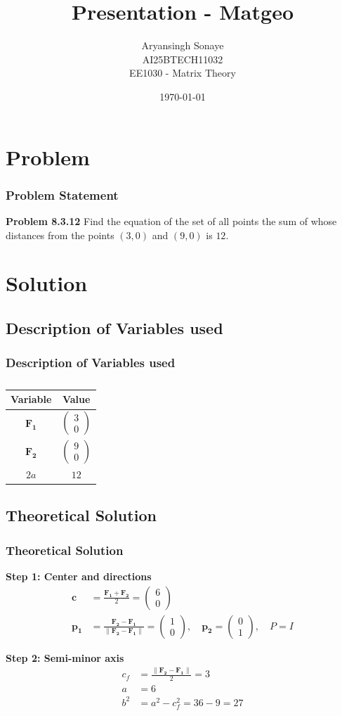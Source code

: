 \documentclass{beamer}
\title{Presentation - Matgeo}
\author{Aryansingh Sonaye \\
AI25BTECH11032 \\
EE1030 - Matrix Theory}
\date{\today}
\theoremstyle{remark}
\newcommand{\myvec}[1]{\ensuremath{\begin{pmatrix}#1\end{pmatrix}}}
\let\vec\mathbf
\numberwithin{equation}{section}
\begin{document}
\begin{frame}
\titlepage
\end{frame}

\section{Problem}
\begin{frame}
\frametitle{Problem Statement}
\textbf{Problem 8.3.12}
Find the equation of the set of all points the sum of whose distances 
from the points $(3,0)$ and $(9,0)$ is $12$.

\end{frame}

\section{Solution}
\subsection{Description of Variables used}
\begin{frame}
\frametitle{Description of Variables used}
\begin{table}[H]
\centering
\begin{tabular}{|c|c|}
\hline
Variable & Value \\
\hline
$\vec{F_1}$ & $\myvec{3\\0}$ \\
\hline
$\vec{F_2}$ & $\myvec{9\\0}$ \\
\hline
$2a$ & $12$ \\
\hline
\end{tabular}
\caption{} \label{}
\end{table}


\end{frame}

\subsection{Theoretical Solution }
\begin{frame}
\frametitle{Theoretical Solution}
\textbf{Step 1: Center and directions}
\begin{align}
\vec{c} &= \frac{\vec{F_1}+\vec{F_2}}{2} 
= \myvec{6\\0} \\[6pt]
\vec{p_1} &= \frac{\vec{F_2}-\vec{F_1}}{\|\vec{F_2}-\vec{F_1}\|}
= \myvec{1\\0}, \quad 
\vec{p_2} = \myvec{0\\1}, \quad 
P = I
\end{align}

\textbf{Step 2: Semi-minor axis}
\begin{align}
c_f &= \frac{\|\vec{F_2}-\vec{F_1}\|}{2} = 3 \\[6pt]
a &= 6 \\[6pt]
b^2 &= a^2 - c_f^2 = 36 - 9 = 27
\end{align}


\end{frame}
\end{document}
